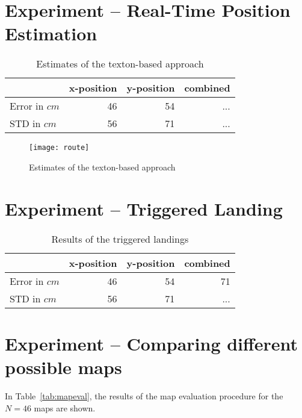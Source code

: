 \section{Experiment -- Real-Time Position Estimation}
\label{sec:experiment-real-time}

\begin{table}[H]
  \centering
  \begin{tabular}{lrrr}
    \toprule
    & x-position & y-position & combined\\
    \midrule
    Error in $cm$ & 46 & 54 & ...\\
    STD in $cm$ & 56 & 71  & ...\\
    \bottomrule
  \end{tabular}
  \caption[Estimates of the texton-based approach]{Estimates of the texton-based approach}
  \label{tab:targetlanding}
\end{table}
\begin{figure}
\texttt{[image: route]}
  \caption[Estimates of the texton-based approach]{Estimates of the texton-based approach}
  \label{fig:route}
\end{figure}

\section{Experiment -- Triggered Landing}
\label{sec:landing}

\begin{table}[H]
  \centering
  \begin{tabular}{lrrr}
    \toprule
    & x-position & y-position & combined\\
    \midrule
    Error in $cm$ & 46 & 54 & 71\\
    STD in $cm$ & 56 & 71  & ...\\
    \bottomrule
  \end{tabular}
  \caption[Triggered landings]{Results of the triggered landings}
  \label{tab:targetlanding}

\end{table}

\section{Experiment -- Comparing different possible maps}
\label{sec:experiment-maps}

In Table~\ref{tab:mapeval}, the results of the map evaluation
procedure for the $N = 46$ maps are shown.

